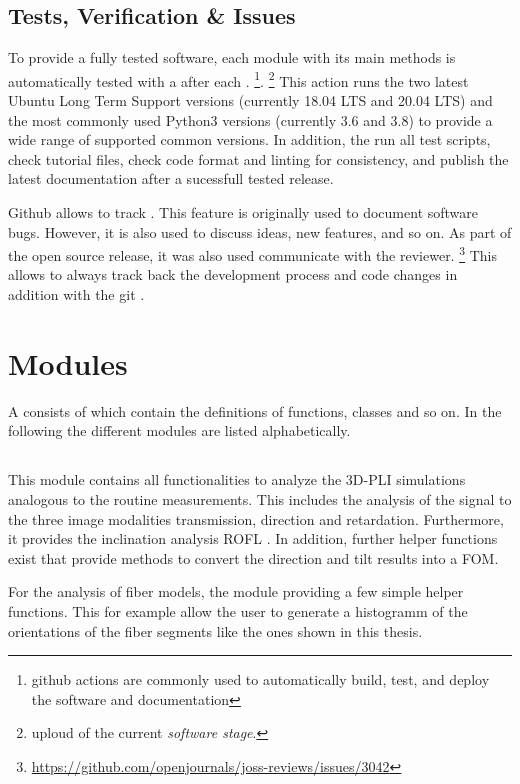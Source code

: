 \subsection{Tests, Verification \& Issues}
%
To provide a fully tested software, each module with its main methods is automatically tested with a  after each .
\footnote{github actions are commonly used to automatically build, test, and deploy the software and documentation}.
\footnote{uploud of the current \textit{software stage}.}
This action runs the two latest Ubuntu Long Term Support versions (currently 18.04 LTS and 20.04 LTS) and the most commonly used Python3 versions (currently 3.6 and 3.8) to provide a wide range of supported common versions.
In addition, the  run all test scripts, check tutorial files, check code format and linting for consistency, and publish the latest documentation after a sucessfull tested release.
\par
%
Github allows to track .
This feature is originally used to document software bugs.
However, it is also used to discuss ideas, new features, and so on.
As part of the open source release, it was also used communicate with the reviewer.
\footnote{\url{https://github.com/openjournals/joss-reviews/issues/3042}}
This allows to always track back the development process and code changes in addition with the git .
%
% 
% 
\section{Modules}
%
A \python{}  consists of  which contain the definitions of functions, classes and so on.
In the following the different modules are listed alphabetically.
%
%
%
\subsection{}
%
This module contains all functionalities to analyze the \ac{3D-PLI} simulations analogous to the routine measurements.
This includes the analysis of the signal to the three image modalities transmission, direction and retardation.
Furthermore, it provides the inclination analysis \ac{ROFL} \cite{Schmitz2018}.
In addition, further helper functions exist that provide methods to convert the direction and tilt results into a \ac{FOM}.
\par
% 
For the analysis of fiber models, the module providing a few simple helper functions.
This for example allow the user to generate a histogramm of the orientations of the fiber segments like the ones shown in this thesis.
%
% 
% 
